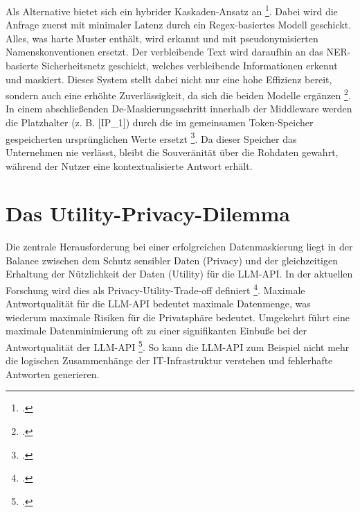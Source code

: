 Als Alternative bietet sich ein hybrider Kaskaden-Ansatz an \footcite{naseer2025recap}. Dabei wird die Anfrage zuerst mit minimaler Latenz
durch ein \ac{Regex}-basiertes Modell geschickt. Alles, was harte Muster enthält, wird erkannt und mit pseudonymisierten Namenskonventionen ersetzt.
Der verbleibende Text wird daraufhin an das \ac{NER}-basierte Sicherheitsnetz geschickt, welches verbleibende Informationen erkennt und maskiert.
Dieses System stellt dabei nicht nur eine hohe Effizienz bereit, sondern auch eine erhöhte Zuverlässigkeit, da sich die beiden Modelle ergänzen \footcite{naseer2025recap}.
In einem abschließenden De-Maskierungsschritt innerhalb der Middleware werden die Platzhalter (z. B. [IP\_1]) durch die im gemeinsamen
Token-Speicher gespeicherten ursprünglichen Werte ersetzt \footcite{vignati2024towardsmiddleware}. Da dieser Speicher das Unternehmen nie verlässt, bleibt die Souveränität über die Rohdaten gewahrt,
während der Nutzer eine kontextualisierte Antwort erhält.


\section{Das Utility-Privacy-Dilemma}

Die zentrale Herausforderung bei einer erfolgreichen Datenmaskierung liegt in der Balance zwischen dem Schutz sensibler Daten (Privacy) und der
gleichzeitigen Erhaltung der Nützlichkeit der Daten (Utility) für die \ac{LLM}-\ac{API}. In der aktuellen Forschung
wird dies als Privacy-Utility-Trade-off definiert \footcite{wang2025revisitingtradeoffs}.
Maximale Antwortqualität für die \ac{LLM}-\ac{API} bedeutet maximale Datenmenge,
was wiederum maximale Risiken für die Privatsphäre bedeutet.
Umgekehrt führt eine maximale Datenminimierung oft zu einer signifikanten Einbuße bei der Antwortqualität der \ac{LLM}-\ac{API} \footcite{wang2025revisitingtradeoffs}.
So kann die \ac{LLM}-\ac{API} zum Beispiel nicht mehr die logischen Zusammenhänge der \ac{IT}-Infrastruktur verstehen und fehlerhafte Antworten generieren.